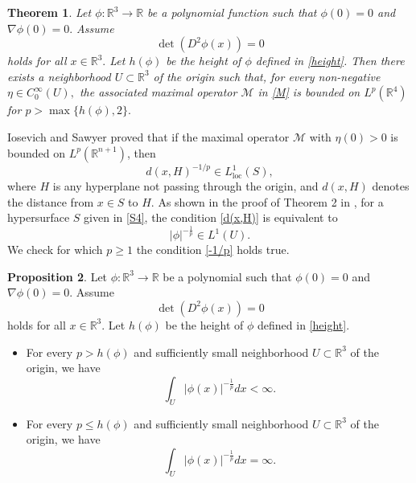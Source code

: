 \documentclass[a4paper, 11pt]{article}
\theoremstyle{plain}
\newtheorem{theorem}{Theorem}[section]
\theoremstyle{definition}
\theoremstyle{lemma}
\theoremstyle{Remark}
\theoremstyle{proposition}
\newtheorem{proposition}[theorem]{Proposition}
\theoremstyle{corollary}
\theoremstyle{example}
\theoremstyle{assumption}
\begin{document}
  \begin{theorem}\label{th:Max}
Let $\phi:\mathbb{R}^3\to \mathbb{R}$ be a polynomial function such that $\phi(0)=0$ and $\nabla\phi(0)=0.$ Assume
$$\det(D^2\phi(x))=0$$
holds for all $x\in \mathbb{R}^3.$ Let $h(\phi)$ be the height of $\phi$ defined in \eqref{height}. Then there exists a neighborhood $U\subset \mathbb{R}^3$ of the origin such that, for every non-negative $\eta\in C^{\infty}_0(U),$ the associated maximal operator $\mathcal{M}$ in \eqref{M} is bounded
on  $L^p(\mathbb{R}^4)$ for $p> \max\{h(\phi),2\}.$   %



  \end{theorem}
Iosevich and Sawyer \cite{Io.Saw} proved that if the maximal operator $\mathcal{M}$ with $\eta(0) > 0$ is bounded on $L^p(\mathbb{R}^{n+1})$, then
  \begin{equation}\label{d(x,H)}
  d(x,H)^{-1/p}\in L^{1}_{\mathrm{loc}}(S),
    \end{equation}
  where $H$ is any hyperplane not passing through the origin, and $d(x,H)$ denotes the distance from $x\in S$ to $H$.   As shown in  the proof of Theorem 2 in  \cite{Io.Saw}, for a hypersurface $S$ given in \eqref{S4}, the condition    \eqref{d(x,H)} is equivalent to
  \begin{equation}\label{-1/p}
  |\phi|^{-\frac{1}{p}}\in L^{1}(U).
   \end{equation}
  We check for which $p\geq 1$ the condition \eqref{-1/p}  holds true.
  \begin{proposition}\label{prop:max}
  Let $\phi:\mathbb{R}^3\to \mathbb{R}$ be a polynomial such that $\phi(0)=0$ and $\nabla\phi(0)=0.$ Assume
$$\det(D^2\phi(x))=0$$
holds for all $x\in \mathbb{R}^3.$ Let $h(\phi)$ be the height of $\phi$ defined in \eqref{height}.
\begin{itemize}
\item[(i)]  For every $p> h(\phi)$ and sufficiently small neighborhood $U\subset \mathbb{R}^3$ of the origin, we have
\begin{equation*}
\int_U |\phi(x)|^{-\frac{1}{p}}dx<\infty.
\end{equation*}
\item[(ii)]  For every $p\leq h(\phi)$ and sufficiently small neighborhood $U\subset \mathbb{R}^3$ of the origin, we have
\begin{equation*}
\int_U |\phi(x)|^{-\frac{1}{p}}dx=\infty.
\end{equation*}
\end{itemize}

  \end{proposition}
\end{document}
